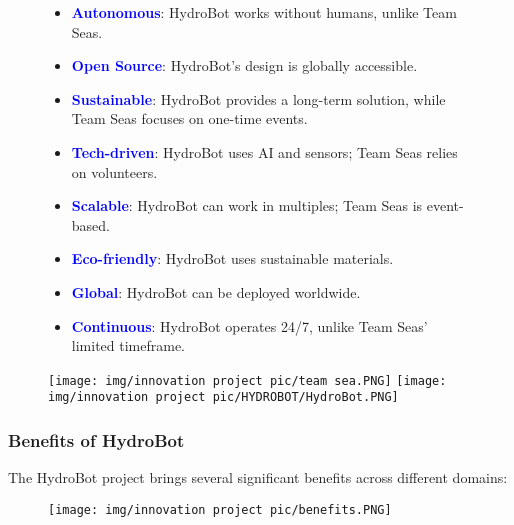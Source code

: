 \begin{figure}[h!]
    \begin{minipage}{0.6\textwidth}
        \begin{itemize}
            \item \textbf{\textcolor{blue}{Autonomous}}: HydroBot works without humans, unlike Team Seas.
            \item \textbf{\textcolor{blue}{Open Source}}: HydroBot’s design is globally accessible.
            \item \textbf{\textcolor{blue}{Sustainable}}: HydroBot provides a long-term solution, while Team Seas focuses on one-time events.
            \item \textbf{\textcolor{blue}{Tech-driven}}: HydroBot uses AI and sensors; Team Seas relies on volunteers.
            \item \textbf{\textcolor{blue}{Scalable}}: HydroBot can work in multiples; Team Seas is event-based.
            \item \textbf{\textcolor{blue}{Eco-friendly}}: HydroBot uses sustainable materials.
            \item \textbf{\textcolor{blue}{Global}}: HydroBot can be deployed worldwide.
            \item \textbf{\textcolor{blue}{Continuous}}: HydroBot operates 24/7, unlike Team Seas’ limited timeframe.
        \end{itemize}
    \end{minipage}
    \hfill
    \begin{minipage}{0.35\textwidth}
        \texttt{[image: img/innovation project pic/team sea.PNG]}
        \texttt{[image: img/innovation project pic/HYDROBOT/HydroBot.PNG]}
    \end{minipage}
\end{figure}


\subsubsection{{Benefits of HydroBot}}

The HydroBot project brings several significant benefits across different domains:
\begin{figure}[h!]
    \centering
    \texttt{[image: img/innovation project pic/benefits.PNG]}
\end{figure}

